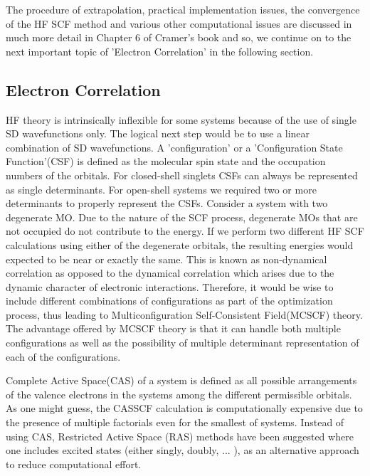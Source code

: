             The procedure of extrapolation, practical implementation issues, the convergence of the HF SCF method and various other computational issues are discussed in much more detail in Chapter 6 of Cramer's book \cite{Cramer} and so, we continue on to the next important topic of 'Electron Correlation' in the following section.

        \subsection{Electron Correlation}\label{subsec:electron correlation}
            HF theory is intrinsically inflexible for some systems because of the use of single SD wavefunctions only. The logical next step would be to use a linear combination of SD wavefunctions. A 'configuration' or a 'Configuration State Function'(CSF) is defined as the molecular spin state and the occupation numbers of the orbitals. For closed-shell singlets CSFs can always be represented as single determinants. For open-shell systems we required two or more determinants to properly represent the CSFs. Consider a system with two degenerate MO. Due to the nature of the SCF process, degenerate MOs that are not occupied do not contribute to the energy. If we perform two different HF SCF calculations using either of the degenerate orbitals, the resulting energies would expected to be near or exactly the same. This is known as non-dynamical correlation as opposed to the dynamical correlation which arises due to the dynamic character of electronic interactions. Therefore, it would be wise to include different combinations of configurations as part of the optimization process, thus leading to Multiconfiguration Self-Consistent Field(MCSCF) theory. The advantage offered by MCSCF theory is that it can handle both multiple configurations as well as the possibility of multiple determinant representation of each of the configurations.

            Complete Active Space(CAS) of a system is defined as all possible arrangements of the valence electrons in the systems among the different permissible orbitals. As one might guess, the CASSCF calculation is computationally expensive due to the presence of multiple factorials even for the smallest of systems. Instead of using CAS, Restricted Active Space (RAS) methods have been suggested where one includes excited states (either singly, doubly, ... ), as an alternative approach to reduce computational effort.

